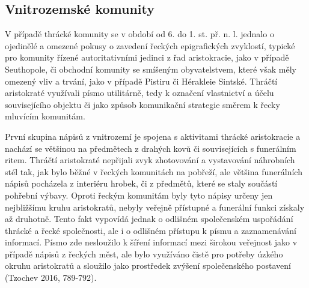 \subsection[vnitrozemské-komunity]{Vnitrozemské komunity}

V případě thrácké komunity se v období od 6. do 1. st. př. n. l. jednalo o ojedinělé a omezené pokusy o zavedení řeckých epigrafických zvyklostí, typické pro komunity řízené autoritativními jedinci z řad aristokracie, jako v případě Seuthopole, či obchodní komunity se smíšeným obyvatelstvem, které však měly omezený vliv a trvání, jako v případě Pistiru či Hérakleie Sintské. Thráčtí aristokraté využívali písmo utilitárně, tedy k označení vlastnictví a účelu souvisejícího objektu či jako způsob komunikační strategie směrem k řecky mluvícím komunitám.

První skupina nápisů z vnitrozemí je spojena s aktivitami thrácké aristokracie a nachází se většinou na předmětech z drahých kovů či souvisejících s funerálním ritem. Thráčtí aristokraté nepřijali zvyk zhotovování a vystavování náhrobních stél tak, jak bylo běžné v řeckých komunitách na pobřeží, ale většina funerálních nápisů pocházela z interiéru hrobek, či z předmětů, které se staly součástí pohřební výbavy. Oproti řeckým komunitám byly tyto nápisy určeny jen nejbližšímu kruhu aristokratů, nebyly veřejně přístupné a funerální funkci získaly až druhotně. Tento fakt vypovídá jednak o odlišném společenském uspořádání thrácké a řecké společnosti, ale i o odlišném přístupu k písmu a zaznamenávání informací. Písmo zde nesloužilo k šíření informací mezi širokou veřejnost jako v případě nápisů z řeckých měst, ale bylo využíváno čistě pro potřeby úzkého okruhu aristokratů a sloužilo jako prostředek zvýšení společenského postavení (Tzochev 2016, 789-792).

